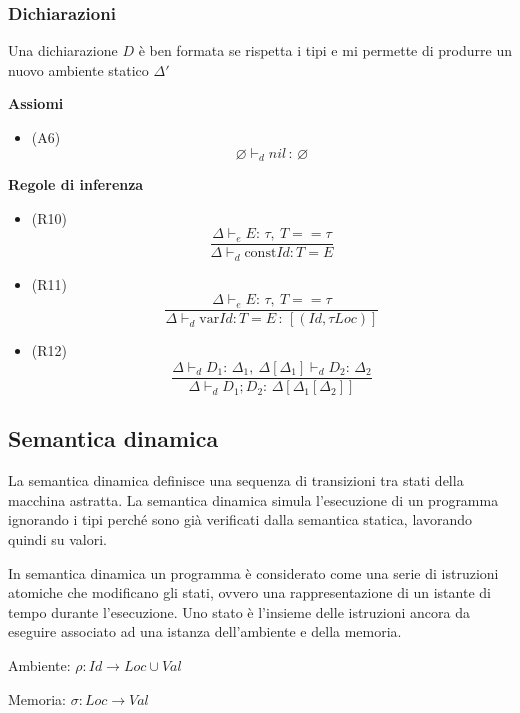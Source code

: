 \documentclass{article}
\begin{document}
\subsubsection{Dichiarazioni}
Una dichiarazione \(D\) è ben formata se rispetta i tipi e mi permette di produrre un nuovo ambiente statico \(\Delta'\)

\vspace{.2cm}

\noindent\textbf{Assiomi}
\begin{itemize}
    \item (A6) \[\varnothing \vdash_d nil \,:\, \varnothing\]
\end{itemize}

\noindent\textbf{Regole di inferenza}
\begin{itemize}
    \item (R10)
          \[\frac
              {\Delta \vdash_e E:\, \tau,\ T == \tau}
              {\Delta \vdash_d \text{const} Id:T = E}\]

    \item (R11)
          \[\frac
              {\Delta \vdash_e E:\, \tau,\ T == \tau}
              {\Delta \vdash_d \text{var} Id:T = E \,:\, [(Id, \tau Loc)]}\]

    \item (R12)
          \[\frac
              {\Delta \vdash_d D_1:\, \Delta_1,\ \Delta[\Delta_1] \vdash_d D_2:\, \Delta_2}
              {\Delta \vdash_d D_1;D_2:\, \Delta[\Delta_1[\Delta_2]]}\]
\end{itemize}

\pagebreak

\subsection{Semantica dinamica}
La semantica dinamica definisce una sequenza di transizioni tra stati della macchina astratta. La semantica dinamica simula l'esecuzione di un programma ignorando i tipi perché sono già verificati dalla semantica statica, lavorando quindi su valori.

In semantica dinamica un programma è considerato come una serie di istruzioni atomiche che modificano gli stati, ovvero una rappresentazione di un istante di tempo durante l'esecuzione. Uno stato è l'insieme delle istruzioni ancora da eseguire associato ad una istanza dell'ambiente e della memoria.

\begin{dfn}{Ambiente: }
    \(\rho: Id \rightarrow Loc \cup Val\)
\end{dfn}
\begin{dfn}{Memoria: }
    \(\sigma: Loc \rightarrow Val\)
\end{dfn}
\end{document}
